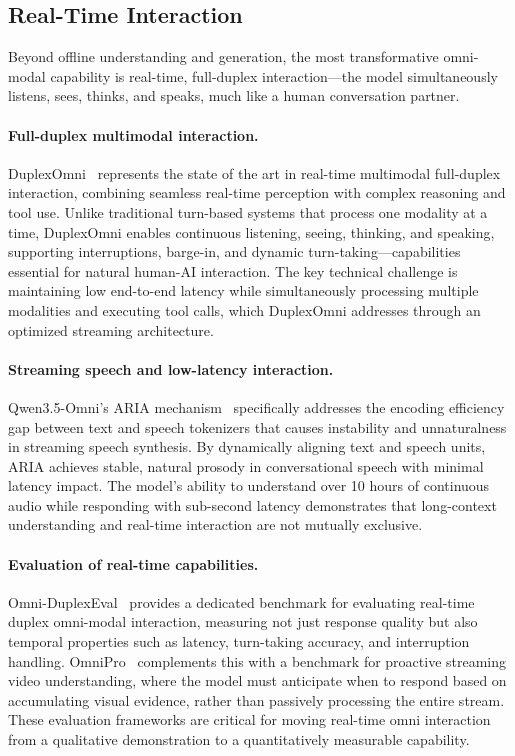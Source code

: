 \documentclass{article}
\begin{document}
\subsection{Real-Time Interaction}

Beyond offline understanding and generation, the most transformative omni-modal capability is real-time, full-duplex interaction---the model simultaneously listens, sees, thinks, and speaks, much like a human conversation partner.

\paragraph{Full-duplex multimodal interaction.}
DuplexOmni~\cite{placeholder2026duplexomni} represents the state of the art in real-time multimodal full-duplex interaction, combining seamless real-time perception with complex reasoning and tool use.
Unlike traditional turn-based systems that process one modality at a time, DuplexOmni enables continuous listening, seeing, thinking, and speaking, supporting interruptions, barge-in, and dynamic turn-taking---capabilities essential for natural human-AI interaction.
The key technical challenge is maintaining low end-to-end latency while simultaneously processing multiple modalities and executing tool calls, which DuplexOmni addresses through an optimized streaming architecture.

\paragraph{Streaming speech and low-latency interaction.}
Qwen3.5-Omni's ARIA mechanism~\cite{qwen2026omni} specifically addresses the encoding efficiency gap between text and speech tokenizers that causes instability and unnaturalness in streaming speech synthesis.
By dynamically aligning text and speech units, ARIA achieves stable, natural prosody in conversational speech with minimal latency impact.
The model's ability to understand over 10 hours of continuous audio while responding with sub-second latency demonstrates that long-context understanding and real-time interaction are not mutually exclusive.

\paragraph{Evaluation of real-time capabilities.}
Omni-DuplexEval~\cite{placeholder2026omniduplexeval} provides a dedicated benchmark for evaluating real-time duplex omni-modal interaction, measuring not just response quality but also temporal properties such as latency, turn-taking accuracy, and interruption handling.
OmniPro~\cite{placeholder2026omnipro} complements this with a benchmark for proactive streaming video understanding, where the model must anticipate when to respond based on accumulating visual evidence, rather than passively processing the entire stream.
These evaluation frameworks are critical for moving real-time omni interaction from a qualitative demonstration to a quantitatively measurable capability.
\end{document}
